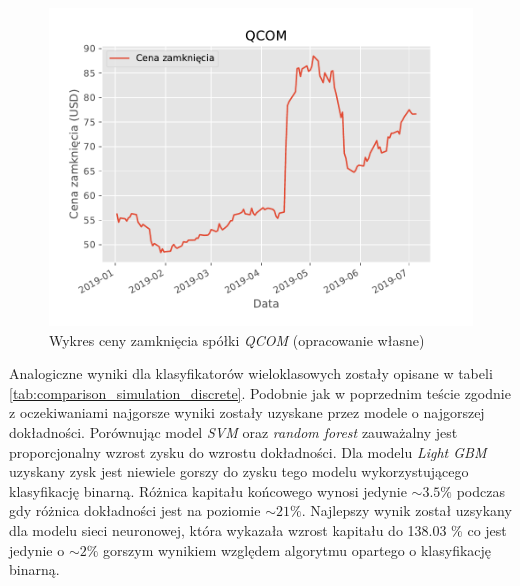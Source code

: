 \documentclass[a4paper, twoside, 11pt, openright]{article}
\begin{document}
\begin{figure}[H]
\centering \includegraphics[scale=1]{img/QCOM_adj_close.pdf}
\caption{Wykres ceny zamknięcia spółki \textit{QCOM} (opracowanie własne)}
\label{img:qcom_adj_close}
\end{figure}


Analogiczne wyniki dla klasyfikatorów wieloklasowych zostały opisane w tabeli \ref{tab:comparison_simulation_discrete}. Podobnie jak w poprzednim teście zgodnie z oczekiwaniami najgorsze wyniki zostały uzyskane przez modele o najgorszej dokładności. Porównując model \textit{SVM} oraz \textit{random forest} zauważalny jest proporcjonalny wzrost zysku do wzrostu dokładności. Dla modelu \textit{Light GBM} uzyskany zysk jest niewiele gorszy do zysku tego modelu wykorzystującego klasyfikację binarną. Różnica kapitału końcowego wynosi jedynie $\sim 3.5\%$ podczas gdy różnica dokładności jest na poziomie $\sim 21\%$. Najlepszy wynik został uzsykany dla modelu sieci neuronowej, która wykazała wzrost kapitału do 138.03 \% co jest jedynie o $\sim 2\%$ gorszym wynikiem względem algorytmu opartego o klasyfikację binarną.

\end{document}
